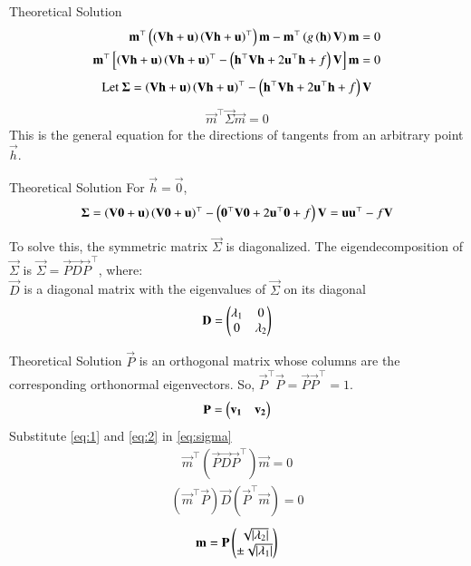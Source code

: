 \documentclass{beamer}
\begin{document}
\begin{frame}{Theoretical Solution}
\begin{align}
    \mathbf{m}^\top \left(\left(\mathbf{V}\mathbf{h} + \mathbf{u}\right)\left(\mathbf{V}\mathbf{h} + \mathbf{u}\right)^\top\right) \mathbf{m} - \mathbf{m}^\top \left(g\left(\mathbf{h}\right)\mathbf{V}\right) \mathbf{m} &= 0 \\
    \mathbf{m}^\top {}\left[\left(\mathbf{V}\mathbf{h} + \mathbf{u}\right)\left(\mathbf{V}\mathbf{h} + \mathbf{u}\right)^\top - \left(\mathbf{h}^\top\mathbf{V}\mathbf{h} + 2\mathbf{u}^\top\mathbf{h} + f\right)\mathbf{V}\right] \mathbf{m} &= 0
\end{align}
\begin{align}
    \text{Let }\mathbf{\Sigma} = \left(\mathbf{V}\mathbf{h} + \mathbf{u}\right)\left(\mathbf{V}\mathbf{h} + \mathbf{u}\right)^\top - \left(\mathbf{h}^\top\mathbf{V}\mathbf{h} + 2\mathbf{u}^\top\mathbf{h} + f\right)\mathbf{V} \label{eq:sigma_notation}
\end{align}
\begin{align}
    \vec{m}^\top \vec{\Sigma} \vec{m} = 0 \label{eq:sigma}
\end{align}
This is the general equation for the directions of tangents from an arbitrary point $\vec{h}$.
\end{frame}

\begin{frame}{Theoretical Solution}
For $\vec{h} = \vec{0}$,
\begin{align}
    \mathbf{\Sigma} = \left(\mathbf{V}\mathbf{0} + \mathbf{u}\right)\left(\mathbf{V}\mathbf{0} + \mathbf{u}\right)^\top - \left(\mathbf{0}^\top\mathbf{V}\mathbf{0} + 2\mathbf{u}^\top\mathbf{0} + f\right)\mathbf{V} = \mathbf{u}\mathbf{u}^\top - f\mathbf{V}
\end{align}

To solve this, the symmetric matrix $\vec{\Sigma}$ is diagonalized. The eigendecomposition of $\vec{\Sigma}$ is $\vec{\Sigma} = \vec{P}\vec{D}\vec{P}^\top$, where: \\
$\vec{D}$ is a diagonal matrix with the eigenvalues of $\vec{\Sigma}$ on its diagonal
\begin{align}
    \mathbf{D} = \begin{pmatrix}\lambda_1 & 0 \\ 0 & \lambda_2\end{pmatrix} \label{eq:1}
\end{align}
\end{frame}

\begin{frame}{Theoretical Solution}
    $\vec{P}$ is an orthogonal matrix whose columns are the corresponding orthonormal eigenvectors. So, $\vec{P}^\top \vec{P} = \vec{P}\vec{P}^\top = 1$.
\begin{align}
    \mathbf{P} = \begin{pmatrix}\mathbf{v_1} & \mathbf{v_2}\end{pmatrix} \label{eq:2}
\end{align}
Substitute \eqref{eq:1} and \eqref{eq:2} in \eqref{eq:sigma}
\begin{align}
    \vec{m}^\top (\vec{P}\vec{D}\vec{P}^\top) \vec{m} = 0
\end{align}
\begin{align}
    (\vec{m}^\top \vec{P})\vec{D}(\vec{P}^\top \vec{m}) = 0
\end{align}
\begin{align}
	\mathbf{m} = \mathbf{P}\begin{pmatrix}\sqrt{\left\vert\lambda_2\right\vert} \\ \pm\sqrt{\left\vert\lambda_1\right\vert}\end{pmatrix} \label{eq:eigenmat}
\end{align}
\end{frame}
\end{document}
